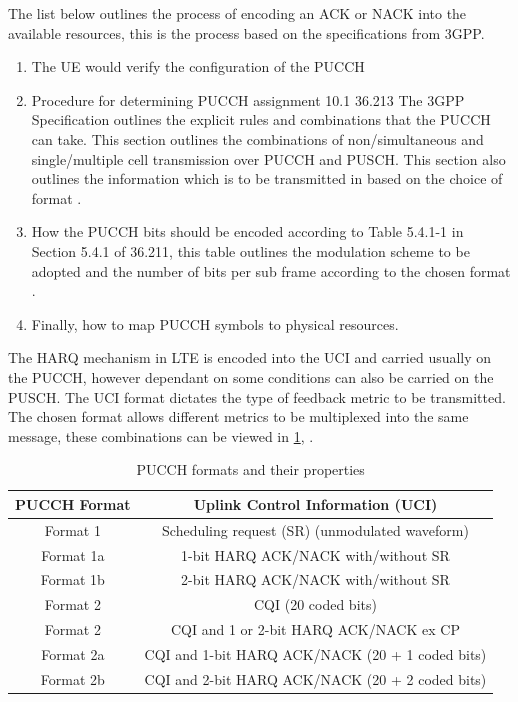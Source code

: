 \documentclass{article}
\begin{document}
The list below outlines the process of encoding an ACK or NACK into the available resources, this is the process based on the specifications from 3GPP.
\begin{enumerate}\label{proc_pucch_configs}
    \item The UE would verify the configuration of the PUCCH \cite[Section 5.4]{36211}
    \item Procedure for determining PUCCH assignment 10.1 36.213 The 3GPP Specification outlines the explicit rules and combinations that the PUCCH can take. This section outlines the combinations of non/simultaneous and single/multiple cell transmission over PUCCH and PUSCH. This section also outlines the information which is to be transmitted in based on the choice of format \cite[Section 10.1]{36211}. 
    \item How the PUCCH bits should be encoded according to Table 5.4.1-1 in Section 5.4.1 of 36.211, this table outlines the modulation scheme to be adopted and the number of bits per sub frame according to the chosen format \cite[Table 5.4.1-1]{36211}.
    \item Finally, how to map PUCCH symbols to physical resources\cite[Section 5.4.3]{36211}.  
\end{enumerate} 

The HARQ mechanism in LTE is encoded into the UCI and carried usually on the PUCCH, however dependant on some conditions can also be carried on the PUSCH. The UCI format dictates the type of feedback metric to be transmitted. The chosen format allows different metrics to be multiplexed into the same message, these combinations can be viewed in \cref{tab:pucch_formats}, \cite[Section 17.3.1.2]{umts_sesia}. 

\begin{table}[h]
\centering
\begin{tabular}{||c| c||} 
\hline
PUCCH Format & Uplink Control Information (UCI) \\ [0.1ex] 
\hline\hline
Format 1 & Scheduling request (SR) (unmodulated waveform)\\ 
\hline
Format 1a & 1-bit HARQ ACK/NACK with/without SR\\
\hline
Format 1b & 2-bit HARQ ACK/NACK with/without SR\\
\hline
Format 2 &  CQI (20 coded bits)\\
\hline
Format 2 & CQI and 1 or 2-bit HARQ ACK/NACK ex CP\\
\hline
Format 2a & CQI and 1-bit HARQ ACK/NACK (20 + 1 coded bits)\\
\hline
Format 2b & CQI and 2-bit HARQ ACK/NACK (20 + 2 coded bits)\\
\hline
\end{tabular}
\caption{PUCCH formats and their properties}
\label{tab:pucch_formats}
\end{table}
\end{document}
